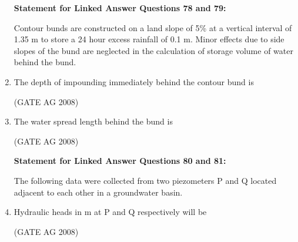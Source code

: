 \documentclass[journal,12pt,onecolumn]{IEEEtran}
\begin{document}
\begin{enumerate}
\medskip


\textbf{Statement for Linked Answer Questions 78 and 79:}

Contour bunds are constructed on a land slope of 5\% at a vertical interval of 1.35 m to store a 24 hour excess rainfall of 0.1 m. Minor effects due to side slopes of the bund are neglected in the calculation of storage volume of water behind the bund.

\item 
 The depth of impounding immediately behind the contour bund is
\begin{enumerate}
\end{enumerate}
\hfill(GATE AG 2008)\\

\medskip

\item 
 The water spread length behind the bund is
\begin{enumerate}
\end{enumerate}
\hfill(GATE AG 2008)\\

\medskip


\textbf{Statement for Linked Answer Questions 80 and 81:}

The following data were collected from two piezometers P and Q located adjacent to each other in a groundwater basin.



\item 
 Hydraulic heads in m at P and Q respectively will be
\begin{enumerate}
\end{enumerate}
\hfill(GATE AG 2008)\\


\end{enumerate}
\end{document}
